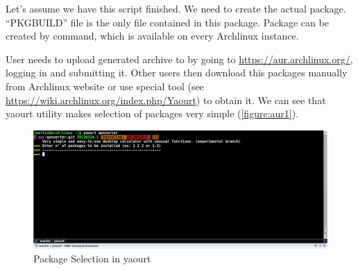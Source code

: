 Let's assume we have this script finished. We need to create the actual package. \enquote{PKGBUILD} file is the only file contained in this package. Package can be created by command, which is available on every Archlinux instance.

User needs to upload generated archive to  by going to \url{https://aur.archlinux.org/}, logging in and submitting it.
 Other users then download this packages manually from Archlinux website or use special tool (see \url{https://wiki.archlinux.org/index.php/Yaourt}) to obtain it. We can see that yaourt utility makes selection of packages very simple (\autoref{figure:aur1}).
 
\begin{figure}[ht]
\begin{center}
\includegraphics[width=14cm]{graphics/real-world/06-aur1.png}
\caption{Package Selection in yaourt}\label{figure:aur1}
\end{center}
\end{figure}